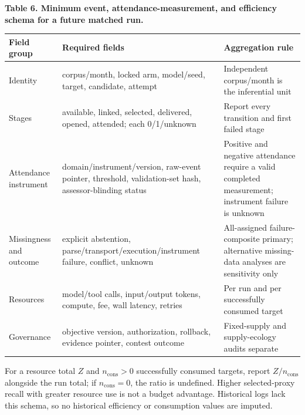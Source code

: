 \documentclass[
  11pt]{article}
\begin{document}
\textbf{Table 6. Minimum event, attendance-measurement, and efficiency
schema for a future matched run.}

\begin{longtable}[]{@{}
  >{\raggedright\arraybackslash}p{}
  >{\raggedright\arraybackslash}p{}
  >{\raggedright\arraybackslash}p{}@{}}
\toprule\noalign{}
\begin{minipage}[b]{\linewidth}\raggedright
Field group
\end{minipage} & \begin{minipage}[b]{\linewidth}\raggedright
Required fields
\end{minipage} & \begin{minipage}[b]{\linewidth}\raggedright
Aggregation rule
\end{minipage} \\
\midrule\noalign{}
\endhead
\bottomrule\noalign{}
\endlastfoot
Identity & corpus/month, locked arm, model/seed, target, candidate,
attempt & Independent corpus/month is the inferential unit \\
Stages & available, linked, selected, delivered, opened, attended; each
0/1/unknown & Report every transition and first failed stage \\
Attendance instrument & domain/instrument/version, raw-event pointer,
threshold, validation-set hash, assessor-blinding status & Positive and
negative attendance require a valid completed measurement; instrument
failure is unknown \\
Missingness and outcome & explicit abstention,
parse/transport/execution/instrument failure, conflict, unknown &
All-assigned failure-composite primary; alternative missing-data
analyses are sensitivity only \\
Resources & model/tool calls, input/output tokens, compute, fee, wall
latency, retries & Per run and per successfully consumed target \\
Governance & objective version, authorization, rollback, evidence
pointer, contest outcome & Fixed-supply and supply-ecology audits
separate \\
\end{longtable}

For a resource total \(Z\) and \(n_{\mathrm{cons}}>0\) successfully
consumed targets, report \(Z/n_{\mathrm{cons}}\) alongside the run
total; if \(n_{\mathrm{cons}}=0\), the ratio is undefined. Higher
selected-proxy recall with greater resource use is not a budget
advantage. Historical logs lack this schema, so no historical efficiency
or consumption values are imputed.
\end{document}
